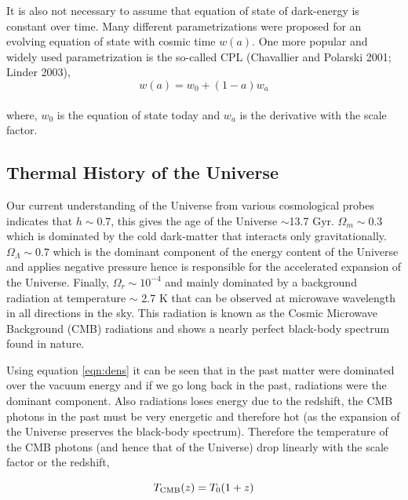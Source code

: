 It is also not necessary to assume that equation of state of dark-energy
is constant over time. Many different parametrizations were proposed
for an evolving equation of state with cosmic time $w(a)$. One more popular
and widely used parametrization is the so-called CPL (Chavallier and Polarski
2001; Linder 2003),
\begin{equation}
	w(a) = w_0 + (1-a)w_a
\end{equation}
\\
where, $w_0$ is the equation of state today and $w_a$ is the derivative with
the scale factor. 

\subsection{Thermal History of the Universe}

Our current understanding of the Universe from various cosmological probes 
indicates that $h \sim 0.7$, this gives the
age of the Universe $\sim$13.7 Gyr.  $\Omega_m \sim 0.3$ which is dominated
by the cold dark-matter that interacts only gravitationally.
$\Omega_{\Lambda} \sim 0.7$ which is the dominant component of the energy
content of the Universe and applies negative pressure hence is responsible
for the accelerated expansion of the Universe. Finally, $\Omega_r \sim 10^{-4}$
and mainly dominated by a background radiation at temperature $\sim$ 2.7 K that
can be observed at microwave wavelength in all directions in the sky. This radiation is
known as the Cosmic Microwave Background (CMB) radiations and shows a nearly
perfect black-body spectrum found in nature.

Using equation \ref{eqn:dens}
it can be seen that in the past matter were dominated over the vacuum 
energy and if we go long back in the past, radiations were the dominant 
component. Also  radiations loses energy due 
to the redshift, the CMB photons in the past must be very energetic and
therefore hot (as the expansion of the Universe preserves the black-body 
spectrum). Therefore the temperature of the CMB photons (and hence that 
of the Universe) drop linearly with the scale factor or the redshift,

\begin{equation}
	T_{\rm CMB}(z) = T_0(1+z)
\end{equation}

